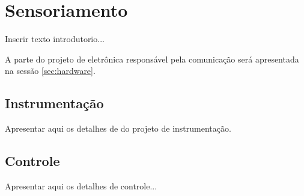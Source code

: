\section{Sensoriamento} %
\label{sec:sensoriamento2}

	Inserir texto introdutorio...

	A parte do projeto de eletrônica responsável pela comunicação será apresentada na sessão \ref{sec:hardware}.

	\subsection{Instrumentação} %
	\label{sub:instrumentação2}
		
		Apresentar aqui os detalhes de do projeto de instrumentação.

	\subsection{Controle} %
	\label{sub:controle2}
		
		Apresentar aqui os detalhes de controle...
